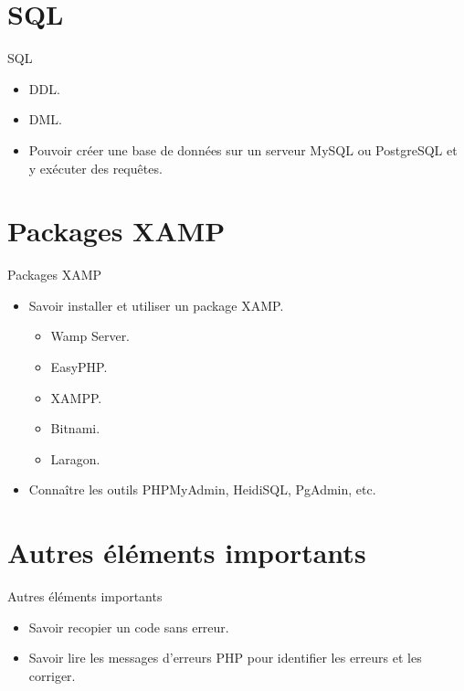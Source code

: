 \documentclass{beamer}
\begin{document}
\section{SQL}
\begin{frame}{SQL}
\begin{center}
\begin{itemize}
  \item DDL.
  \item DML.
  \item Pouvoir créer une base de données sur un serveur MySQL ou PostgreSQL et y exécuter des requêtes.
\end{itemize}
\end{center}
\end{frame}

\section{Packages XAMP}
\begin{frame}{Packages XAMP}
\begin{itemize}
  \item Savoir installer et utiliser un package XAMP.
    \begin{itemize}
      \item Wamp Server.
      \item EasyPHP.
      \item XAMPP.
      \item Bitnami.
      \item Laragon.
    \end{itemize}
  \item Connaître les outils PHPMyAdmin, HeidiSQL, PgAdmin, etc.
\end{itemize}
\end{frame}

\section{Autres éléments importants}
\begin{frame}{Autres éléments importants}
\begin{itemize}
  \item Savoir recopier un code sans erreur.
  \item Savoir lire les messages d'erreurs PHP pour identifier les erreurs et les corriger.
\end{itemize}
\end{frame}
\end{document}
